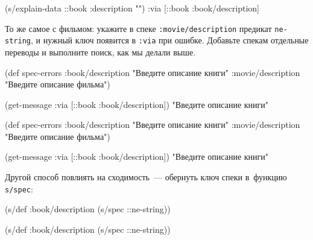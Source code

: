 \else

\begin{english}
  \begin{clojure}
(s/explain-data ::book {:description ""})
{:via [::book :book/description]}
  \end{clojure}
\end{english}

\fi

То же самое с фильмом: укажите в спеке \verb|:movie/description| предикат
\verb|ne-string|, и нужный ключ появится в \verb|:via| при ошибке. Добавьте
спекам отдельные переводы и выполните поиск, как мы делали выше.

\ifx\DEVICETYPE\MOBILE

  \begin{clojure}
(def spec-errors
  {:book/description
   "Введите описание книги"
   :movie/description
   "Введите описание фильма"})

(get-message
  {:via [::book :book/description]})
"Введите описание книги"
  \end{clojure}

\else

  \begin{clojure}
(def spec-errors
  {:book/description "Введите описание книги"
   :movie/description "Введите описание фильма"})

(get-message {:via [::book :book/description]})
"Введите описание книги"
  \end{clojure}

\fi

Другой способ повлиять на сходимость~--- обернуть ключ спеки в~функцию
\verb|s/spec|:

\ifx\DEVICETYPE\MOBILE

\begin{english}
  \begin{clojure}
(s/def :book/description
  (s/spec ::ne-string))
  \end{clojure}
\end{english}

\else

\begin{english}
  \begin{clojure}
(s/def :book/description (s/spec ::ne-string))
  \end{clojure}
\end{english}

